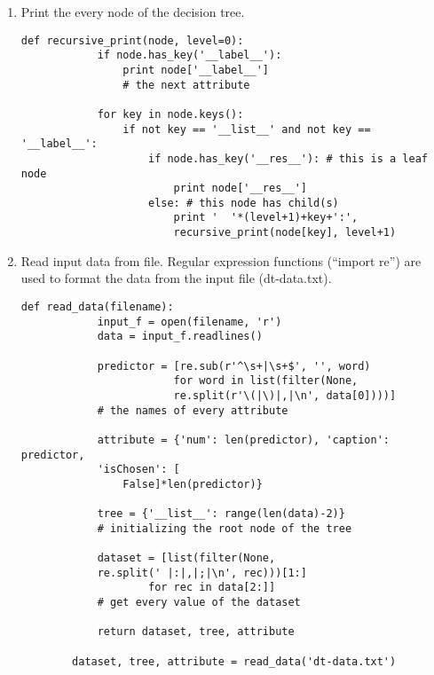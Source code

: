\documentclass[12pt,letterpaper]{article}
\begin{document}
\begin{enumerate}
    \item Print the every node of the decision tree.
    \begin{lstlisting}[style = python]
        def recursive_print(node, level=0):
            if node.has_key('__label__'):
                print node['__label__'] 
                # the next attribute

            for key in node.keys():
                if not key == '__list__' and not key == '__label__':
                    if node.has_key('__res__'): # this is a leaf node
                        print node['__res__']
                    else: # this node has child(s)
                        print '  '*(level+1)+key+':',
                        recursive_print(node[key], level+1)
    \end{lstlisting}
     
  \item Read input data from file.  Regular expression functions (``import re'') are used to format the data from the input file (dt-data.txt).
    \begin{lstlisting}[style=python]
        def read_data(filename):
            input_f = open(filename, 'r')
            data = input_f.readlines()

            predictor = [re.sub(r'^\s+|\s+$', '', word)
                        for word in list(filter(None, 
                        re.split(r'\(|\)|,|\n', data[0])))]
            # the names of every attribute

            attribute = {'num': len(predictor), 'caption': predictor, 
            'isChosen': [
                False]*len(predictor)}

            tree = {'__list__': range(len(data)-2)}
            # initializing the root node of the tree

            dataset = [list(filter(None, 
            re.split(' |:|,|;|\n', rec)))[1:]
                    for rec in data[2:]]
            # get every value of the dataset

            return dataset, tree, attribute

        dataset, tree, attribute = read_data('dt-data.txt')
    \end{lstlisting}


\end{enumerate}
\end{document}
